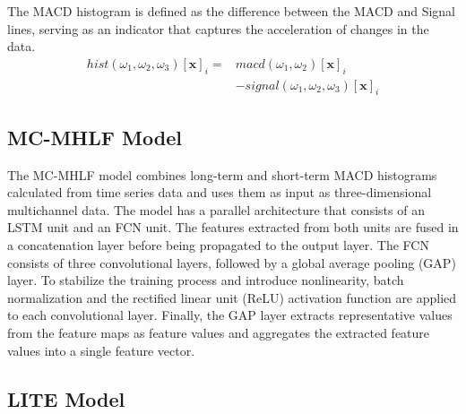 \documentclass[conference]{IEEEtran}
\begin{document}
The MACD histogram is defined as the difference between the MACD and Signal lines, serving as an indicator that captures the acceleration of changes in the data.
\begin{equation}
\begin{split}
hist(\omega_1,\omega_2,\omega_3)[\mathbf{x}]_i ={}& macd(\omega_1,\omega_2)[\mathbf{x}]_i\\
& -signal(\omega_1,\omega_2,\omega_3)[\mathbf{x}]_i
\end{split}
\end{equation}

\subsection{MC-MHLF Model}

The MC-MHLF model combines long-term and short-term MACD histograms calculated from time series data and uses them as input as three-dimensional multichannel data. The model has a parallel architecture that consists of an LSTM unit and an FCN unit. The features extracted from both units are fused in a concatenation layer before being propagated to the output layer. The FCN consists of three convolutional layers, followed by a global average pooling (GAP) layer. To stabilize the training process and introduce nonlinearity, batch normalization and the rectified linear unit (ReLU) activation function are applied to each convolutional layer. Finally, the GAP layer extracts representative values from the feature maps as feature values and aggregates the extracted feature values into a single feature vector.

\subsection{LITE Model}
\end{document}
